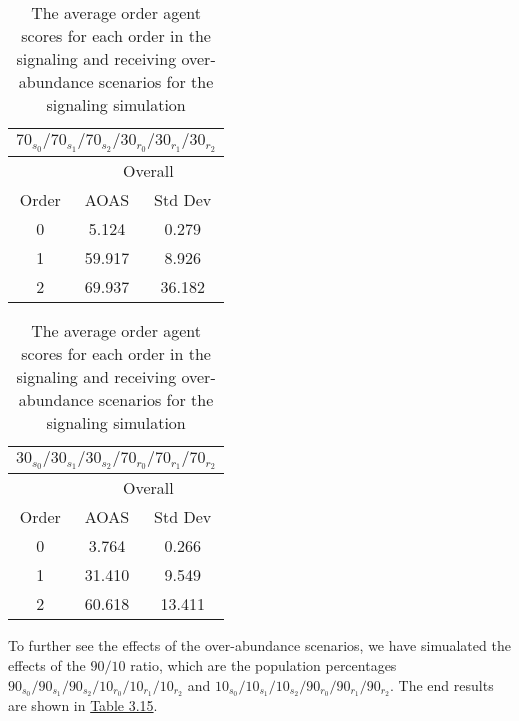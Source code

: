 \begin{table}[h]
    \centering
    \begin{tabular}{|c|c|c|}
    \hline
    \multicolumn{3}{|c|}{$70_{s_{0}}/70_{s_{1}}/70_{s_{2}}/30_{r_{0}}/30_{r_{1}}/30_{r_{2}}$} \\
    \hline
    \multicolumn{1}{|c|}{} & \multicolumn{2}{|c|}{Overall} \\
    \hline
    Order & AOAS & Std Dev \\
    \hline
    0     & 5.124   & 0.279    \\ 
    1     & 59.917  & 8.926   \\
    2     & 69.937  & 36.182   \\ 
    \hline
    \end{tabular}
    \qquad
    \begin{tabular}{|c|c|c|}
    \hline
    \multicolumn{3}{|c|}{$30_{s_{0}}/30_{s_{1}}/30_{s_{2}}/70_{r_{0}}/70_{r_{1}}/70_{r_{2}}$} \\
    \hline
    \multicolumn{1}{|c|}{} & \multicolumn{2}{|c|}{Overall} \\
    \hline
    Order & AOAS & Std Dev \\
    \hline
    0     & 3.764   & 0.266    \\
    1     & 31.410  & 9.549   \\ 
    2     & 60.618  & 13.411   \\ 
    \hline
    \end{tabular}
    \caption{The average order agent scores for each order in the signaling and receiving over-abundance scenarios for the signaling simulation}
    \label{table:sig-overall}
\end{table}


To further see the effects of the over-abundance scenarios, we have simualated the effects of the $90/10$ ratio, which are the population percentages $90_{s_{0}}/90_{s_{1}}/90_{s_{2}}/10_{r_{0}}/10_{r_{1}}/10_{r_{2}}$ and $10_{s_{0}}/10_{s_{1}}/10_{s_{2}}/90_{r_{0}}/90_{r_{1}}/90_{r_{2}}$. The end results are shown in \hyperref[table:sig-over-abundance-90]{Table 3.15}.

